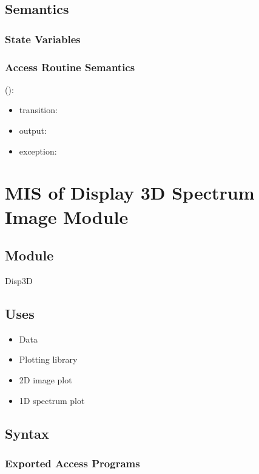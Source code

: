\documentclass[12pt, titlepage]{article}
\begin{document}
\subsection{Semantics}

\subsubsection{State Variables}


\subsubsection{Access Routine Semantics}

\noindent {}():
\begin{itemize}
\item transition:  
\item output:  
\item exception:  
\end{itemize}

\section{MIS of Display 3D Spectrum Image Module} \label{Mod:Disp3D}

\subsection{Module}

Disp3D

\subsection{Uses}
\begin{itemize}
	\item Data
	\item Plotting library
	\item 2D image plot
	\item 1D spectrum plot
\end{itemize}

\subsection{Syntax}


\subsubsection{Exported Access Programs}
\end{document}
